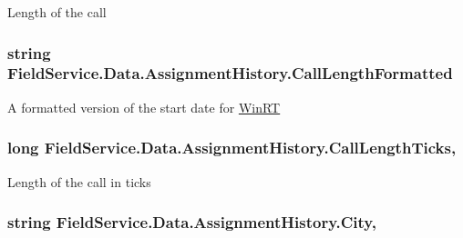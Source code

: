 Length of the call 

\hypertarget{class_field_service_1_1_data_1_1_assignment_history_addfdb67fdeb889866e1d3ad658ffda0e}{
\subsubsection[{Call\+Length\+Formatted}]{\setlength{\rightskip}{0pt plus 5cm}string Field\+Service.\+Data.\+Assignment\+History.\+Call\+Length\+Formatted\hspace{0.3cm}{\ttfamily [get]}}}\label{class_field_service_1_1_data_1_1_assignment_history_addfdb67fdeb889866e1d3ad658ffda0e}


A formatted version of the start date for \hyperlink{namespace_field_service_1_1_win_r_t}{Win\+R\+T} 

\hypertarget{class_field_service_1_1_data_1_1_assignment_history_a8b0716160be52900e6a30d7dac22f881}{
\subsubsection[{Call\+Length\+Ticks}]{\setlength{\rightskip}{0pt plus 5cm}long Field\+Service.\+Data.\+Assignment\+History.\+Call\+Length\+Ticks\hspace{0.3cm}{\ttfamily [get]}, {\ttfamily [set]}}}\label{class_field_service_1_1_data_1_1_assignment_history_a8b0716160be52900e6a30d7dac22f881}


Length of the call in ticks 

\hypertarget{class_field_service_1_1_data_1_1_assignment_history_aa8b6487e70fa9f2fc46e25ce101c8e10}{
\subsubsection[{City}]{\setlength{\rightskip}{0pt plus 5cm}string Field\+Service.\+Data.\+Assignment\+History.\+City\hspace{0.3cm}{\ttfamily [get]}, {\ttfamily [set]}}}\label{class_field_service_1_1_data_1_1_assignment_history_aa8b6487e70fa9f2fc46e25ce101c8e10}


